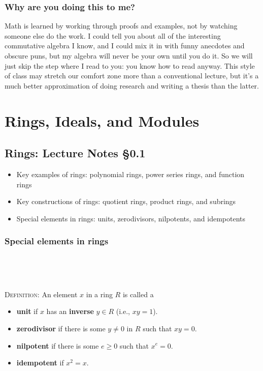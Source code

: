 \documentclass[12pt]{amsart}
\newcommand{\0}{$\phantom{.}$}
\newcommand{\1}{\mathbbm{1}}
\begin{document}
\subsubsection*{Why are you doing this to me?\nopunct} Math is learned by working through proofs and examples, not by watching someone else do the work. I could tell you about all of the interesting commutative algebra I know, and I could mix it in with funny anecdotes and obscure puns, but my algebra will never be your own until you do it. So we will just skip the step where I read to you: you know how to read anyway. This style of class may stretch our comfort zone more than a conventional lecture, but it's a much better approximation of doing research and writing a thesis than the latter.



\newpage



\section{Rings, Ideals, and Modules}

\subsection{Rings: Lecture Notes \S0.1}

\begin{framed}
\begin{itemize}
\item Key examples of rings: polynomial rings, power series rings, and function rings
\item Key constructions of rings: quotient rings, product rings, and subrings
\item Special elements in rings: units, zerodivisors, nilpotents, and idempotents
\end{itemize}
\end{framed}

\subsubsection*{Special elements in rings}

\

\

\noindent \textsc{Definition:} An element $x$ in a ring $R$ is called a
\begin{itemize}
\item \textbf{unit} if $x$ has an \textbf{inverse} $y\in R$ (i.e., $xy=1$).
\item \textbf{zerodivisor} if there is some $y\neq 0$ in $R$ such that $xy=0$.
\item \textbf{nilpotent} if there is some $e\geq 0$ such that $x^e=0$.
\item \textbf{idempotent} if $x^2 = x$.
\end{itemize}
\end{document}
